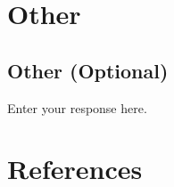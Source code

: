 \documentclass[]{article}
\begin{document}
\hypertarget{other}{%
\section{Other}\label{other}}

\hypertarget{other-optional}{%
\subsection{Other (Optional)}\label{other-optional}}

Enter your response here.

\hypertarget{references}{%
\section{References}\label{references}}

\hypertarget{section}{%
\subsection{}\label{section}}

\vspace{-2pc}
\setlength{\parindent}{-0.5in}
\setlength{\leftskip}{-1in}
\setlength{\parskip}{8pt}

\noindent
\end{document}
